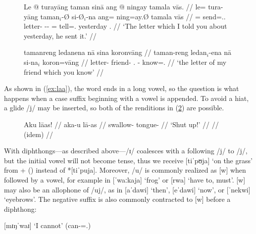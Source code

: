 \begin{figure}[h]
\pex\label{ex:relmorphophon}
\a\label{ex:relmorphophon_1}%
\begingl
	\gla Le @ turayāng taman sinā ang @ ningay tamala vās. //
	\glb le= tura-yāng taman$_i$-Ø si-Ø$_i$-na ang= ning=ay.Ø 
		tamala vās //
	\glc \PatTI{}= send=\Tsg{}.\M{}.\Aarg{} letter-\Top{} 
		\Rel{}-\PatTI{}-\Gen{} \AgtT{}= tell=\Fsg{}.\Top{} yesterday 
		\Ssg{}.\Parg{} //
	\glft `The letter which I told you about yesterday, he sent it.' //
\endgl

\a\label{ex:relmorphophon_2}%
\begingl
	\gla tamanreng ledanena nā sina koronvāng //
	\glb taman-reng ledan$_i$-ena nā si-na$_i$ koron=vāng //
	\glc letter-\AargI{} friend-\Gen{} \Fsg.\Gen{} \Rel{}-\Gen{} 
		know=\Ssg{}.\Aarg{} //
	\glft `the letter of my friend which you know' //
\endgl
\xe
\end{figure}

As shown in (\ref{ex:laa}), the word  ends in a long
vowel, so the question is what happens when a case suffix beginning with a
vowel is appended. To avoid a hiat, a glide /j/ may be inserted, so both of the
renditions in (\ref{ex:hiat}) are possible.

\begin{figure}[h]
\pex\label{ex:hiat}
	\a\begingl
		\gla Aku lāas! //
		\glb aka-u lā-as //
		\glc swallow-\Imp{} tongue-\Parg{} //
		\glft `Shut up!' //
	\endgl
	\a\begingl
		 //
		\glft (idem) //
	\endgl
\xe
\end{figure}

With diphthongs---as described above---/ɪ/ coalesces with a following /j/ to
/j/, but the initial vowel will not become tense, thus we receive
 [tiˈpʊja] `on the grass' from
 +  (\Loc{}) instead of *[tiˈpuja].
Moreover, /u/ is commonly realized as [w] when followed by a vowel, for example
in  [ˈwaːkaja] `frog' or  [rwa] `have
to, must'. [w] may also be an allophone of /uj/, as in 
[aˈdawi] `then',  [eˈdawi] `now', or 
[ˈnekwi] `eyebrows'. The negative suffix  is also commonly
contracted to [w] before a diphthong:

\ex
	 [mɪŋˈwaɪ] 
		`I cannot' (can-\Neg{}=\Fsg{}.\Top{})
\xe

%
%

